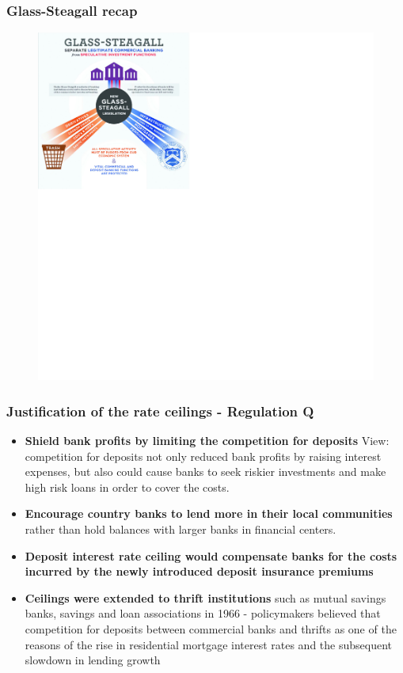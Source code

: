 \documentclass[11pt]{beamer}
\begin{document}
\begin{frame}
\frametitle{Glass-Steagall recap}
\begin{figure}
\includegraphics[width=1.5\textwidth]{GS3.png}
\end{figure}
\end{frame}

\begin{frame}
\frametitle{Justification of the rate ceilings - Regulation Q}
\begin{itemize}
\item \textbf{Shield bank profits by limiting the competition for
deposits} View: competition for deposits not only reduced bank profits by raising interest expenses, but also could cause banks to seek riskier investments and make high risk loans in order to cover the costs.
\item \textbf{Encourage country banks to lend more in their local communities} rather than hold balances with larger banks in financial centers.
\item \textbf{Deposit interest rate ceiling would compensate banks for the costs incurred by the newly introduced
deposit insurance premiums}
\item \textbf{Ceilings were extended to thrift institutions} such as
mutual savings banks, savings and loan associations in 1966 - policymakers believed that competition for deposits between commercial banks and thrifts as one of the reasons of the rise in residential mortgage interest rates and the subsequent slowdown in lending growth

\end{itemize}
\end{frame}
\end{document}
